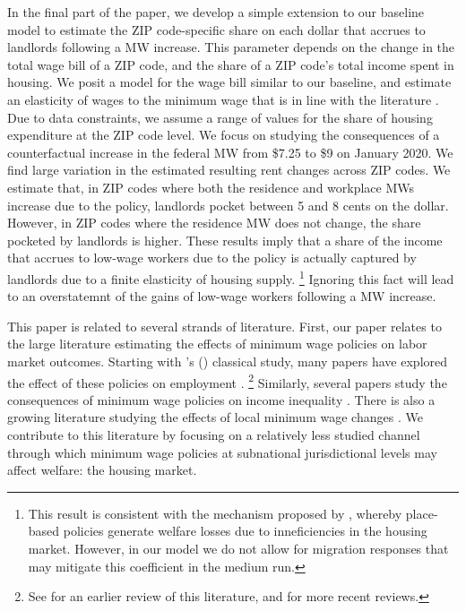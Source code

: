 In the final part of the paper, we develop a simple extension to our baseline 
model to estimate the ZIP code-specific share on each dollar that accrues to 
landlords following a MW increase.
This parameter depends on the change in the total wage bill of a ZIP code, and 
the share of a ZIP code's total income spent in housing.
We posit a model for the wage bill similar to our baseline, and estimate an 
elasticity of wages to the minimum wage that is in line with the literature
\parencite[e.g.,][]{CegnizEtAl2019}.
Due to data constraints, we assume a range of values for the share of housing
expenditure at the ZIP code level.
We focus on studying the consequences of a counterfactual increase in the federal 
MW from \$7.25 to \$9 on January 2020.
We find large variation in the estimated resulting rent changes across ZIP codes.
We estimate that, in ZIP codes where both the residence and workplace MWs increase
due to the policy, landlords pocket between 5 and 8 cents on the dollar.
However, in ZIP codes where the residence MW does not change, the share pocketed
by landlords is higher.
These results imply that a share of the income that accrues to low-wage workers
due to the policy is actually captured by landlords due to a finite elasticity 
of housing supply.%
\footnote{This result is consistent with the mechanism proposed by 
\textcite{KlineMoretti2014}, whereby place-based policies generate welfare losses
due to inneficiencies in the housing market.
However, in our model we do not allow for migration responses that may mitigate
this coefficient in the medium run.}
Ignoring this fact will lead to an overstatemnt of the gains of low-wage workers
following a MW increase.


This paper is related to several strands of literature.
First, our paper relates to the large literature estimating the effects of minimum 
wage policies on labor market outcomes.
Starting with \citeauthor{CardKrueger1994}'s (\citeyear{CardKrueger1994}) 
classical study, many papers have explored the effect of these policies on 
employment \parencite[some recent examples include][]{MeerWest2016,
CegnizEtAl2019}.%
\footnote{See \textcite{Neumark2006} for an earlier review of this literature,
and \textcite{Dube2019, NeumarkShirley2021} for more recent reviews.}
Similarly, several papers study the consequences of minimum wage policies on 
income inequality \parencite{Lee1999, AutorEtAl2016}.
There is also a growing literature studying the effects of local minimum wage 
changes \parencite{DubeLindner2021}.
We contribute to this literature by focusing on a relatively less studied channel
through which minimum wage policies at subnational jurisdictional levels 
may affect welfare: the housing market.

